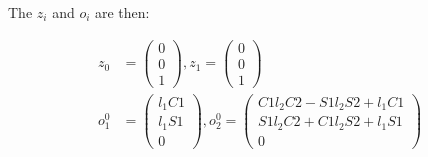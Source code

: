 The $z_i$ and $o_i$ are then:

\begin{align*}
z_0 &= 
\begin{pmatrix}
0 \\ 0 \\ 1
\end{pmatrix},
z_1 = 
\begin{pmatrix}
0 \\ 0 \\ 1
\end{pmatrix}\\
o_1^0 &= 
\begin{pmatrix}
l_1C1 \\ l_1S1 \\ 0
\end{pmatrix},
o_2^0 = 
\begin{pmatrix}
C1l_2C2-S1l_2S2+l_1C1 \\ S1l_2C2+C1l_2S2+l_1S1 \\ 0
\end{pmatrix}\\
\end{align*}

